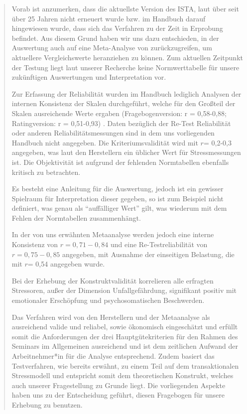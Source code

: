 \documentclass[12pt, a4paper]{article}
\begin{document}
\blockquote{
\tiny    
Vorab ist anzumerken, dass die aktuellste Version des ISTA, laut über 
seit über 25 Jahren nicht
erneuert wurde bzw. im Handbuch darauf hingewiesen wurde, dass sich das Verfahren zu
der Zeit in Erprobung befindet.
Aus diesem Grund haben wir uns dazu entschieden, in der
Auswertung auch auf eine Meta-Analyse von \textcite{irmerInstrumentStressOrientedTask2019}
zurückzugreifen, um aktuellere Vergleichswerte heranziehen zu können. 
Zum aktuellen Zeitpunkt der Testung liegt laut unserer Recherche keine Normwerttabelle 
für unsere zukünftigen Auswertungen und Interpretation vor.

Zur Erfassung der Reliabilität wurden im Handbuch lediglich Analysen der internen
Konsistenz der Skalen durchgeführt, welche für den Großteil der Skalen ausreichende Werte
ergaben (Fragebogenversion: r = 0,58-0,88; Ratingversion: r = 0,51-0,93) 
\parencite{semmerInstrumentZurStressbezogenen1999}. 
Daten bezüglich der Re-Test Reliabilität oder anderen Reliabilitätsmessungen sind in
dem uns vorliegenden Handbuch nicht angegeben. 
Die Kriteriumsvalidität wird mit $r$= 0,2-0,3
angegeben, was laut den Herstellern ein üblicher Wert für Stressmessungen ist.
Die Objektivität ist aufgrund der fehlenden Normtabellen ebenfalls kritisch zu betrachten. 

Es besteht eine Anleitung für die Auswertung, jedoch ist ein gewisser Spielraum für
Interpretation dieser gegeben, so ist zum Beispiel nicht definiert, was genau als “auffälliger
Wert” gilt, was wiederum mit dem Fehlen der Normtabellen zusammenhängt.

In der von uns erwähnten Metaanalyse werden jedoch eine interne Konsistenz von 
$r = 0,71-0,84$ und eine Re-Testreliabilität von $r =0,75-0,85$ angegeben, mit Ausnahme der
einseitigen Belastung, die mit $r$= 0,54 angegeben wurde.

Bei der Erhebung der Konstruktvalidität korrelieren alle erfragten Stressoren, außer der
Dimension Unfallgefährdung, signifikant positiv mit emotionaler Erschöpfung und
psychosomatischen Beschwerden.

Das Verfahren wird von den Herstellern und der Metaanalyse als ausreichend valide und
reliabel, sowie ökonomisch eingeschätzt und erfüllt somit die Anforderungen der drei
Hauptgütekriterien für den Rahmen des Seminars im Allgemeinen ausreichend und ist dem
zeitlichen Aufwand der Arbeitnehmer*in für die Analyse entsprechend. Zudem basiert das
Testverfahren, wie bereits erwähnt, zu einem Teil auf dem transaktionalen Stressmodell und
entspricht somit dem theoretischen Konstrukt, welches auch unserer Fragestellung zu
Grunde liegt. Die vorliegenden Aspekte haben uns zu der Entscheidung geführt, diesen
Fragebogen für unsere Erhebung zu benutzen.}
\end{document}
